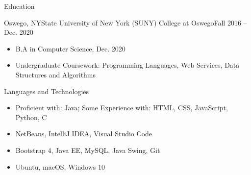 \documentclass[]{johnsoncv}
\begin{document}
	\makeheader
	
	
	\begin{cvsection}{Education}
		\begin{cvsubsection}{Oswego, NY}{State University of New York (SUNY) College at Oswego}{Fall 2016 – Dec. 2020}
			\begin{itemize}
				\item B.A in Computer Science, Dec. 2020
				\item Undergraduate Coursework: Programming Languages, Web Services, Data Structures and Algorithms
			\end{itemize}
		\end{cvsubsection}
	\end{cvsection}

	\begin{cvsection}{Languages and Technologies}
		\begin{cvsubsection}{}{}{}	
			\begin{itemize}
				\item Proficient with: Java; Some Experience with: HTML, CSS, JavaScript, Python, C
				\item NetBeans, IntelliJ IDEA, Visual Studio Code
				\item Bootstrap 4, Java EE, MySQL, Java Swing, Git
				\item Ubuntu, macOS, Windows 10
			\end{itemize}
		\end{cvsubsection}
	\end{cvsection}

\end{document}

